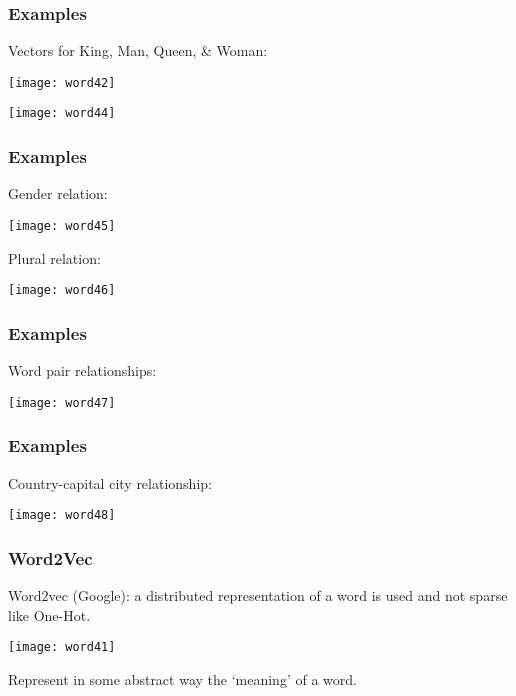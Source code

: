 \begin{frame}[fragile]\frametitle{Examples}
Vectors for King, Man, Queen, \& Woman:
\begin{center}
\texttt{[image: word42]}
\end{center}


\begin{center}
\texttt{[image: word44]}
\end{center}

\end{frame}

\begin{frame}[fragile]\frametitle{Examples}
Gender relation:
\begin{center}
\texttt{[image: word45]}
\end{center}
Plural relation:

\begin{center}
\texttt{[image: word46]}
\end{center}

\end{frame}

\begin{frame}[fragile]\frametitle{Examples}
Word pair relationships:
\begin{center}
\texttt{[image: word47]}
\end{center}
\end{frame}

\begin{frame}[fragile]\frametitle{Examples}
Country-capital city relationship:

\begin{center}
\texttt{[image: word48]}
\end{center}

\end{frame}



\begin{frame}[fragile]\frametitle{Word2Vec}
Word2vec  (Google): a distributed representation of a word is used and not sparse like One-Hot.
\begin{center}
\texttt{[image: word41]}
\end{center}
Represent in some abstract way the `meaning' of a word.

\end{frame}


